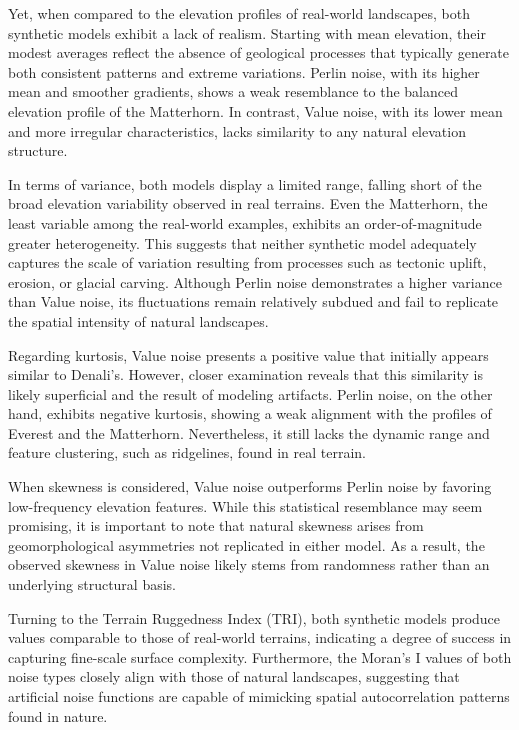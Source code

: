 Yet, when compared to the elevation profiles of real-world landscapes, both synthetic models exhibit a lack of realism. Starting with mean elevation, their modest averages reflect the absence of 
geological processes that typically generate both consistent patterns and extreme variations. Perlin noise, with its higher mean and smoother gradients, shows a weak resemblance to the balanced 
elevation profile of the Matterhorn. In contrast, Value noise, with its lower mean and more irregular characteristics, lacks similarity to any natural elevation structure.

In terms of variance, both models display a limited range, falling short of the broad elevation variability observed in real terrains. Even the Matterhorn, the least variable among the real-world 
examples, exhibits an order-of-magnitude greater heterogeneity. This suggests that neither synthetic model adequately captures the scale of variation resulting from processes such as tectonic 
uplift, erosion, or glacial carving. Although Perlin noise demonstrates a higher variance than Value noise, its fluctuations remain relatively subdued and fail to replicate the spatial intensity 
of natural landscapes.

Regarding kurtosis, Value noise presents a positive value that initially appears similar to Denali's. However, closer examination reveals that this similarity is likely superficial and the result 
of modeling artifacts. Perlin noise, on the other hand, exhibits negative kurtosis, showing a weak alignment with the profiles of Everest and the Matterhorn. Nevertheless, it still lacks the dynamic 
range and feature clustering, such as ridgelines, found in real terrain.

When skewness is considered, Value noise outperforms Perlin noise by favoring low-frequency elevation features. While this statistical resemblance may seem promising, it is important to note that 
natural skewness arises from geomorphological asymmetries not replicated in either model. As a result, the observed skewness in Value noise likely stems from randomness rather than an underlying 
structural basis.

Turning to the Terrain Ruggedness Index (TRI), both synthetic models produce values comparable to those of real-world terrains, indicating a degree of success in capturing fine-scale surface complexity. 
Furthermore, the Moran's I values of both noise types closely align with those of natural landscapes, suggesting that artificial noise functions are capable of mimicking spatial autocorrelation patterns 
found in nature.

